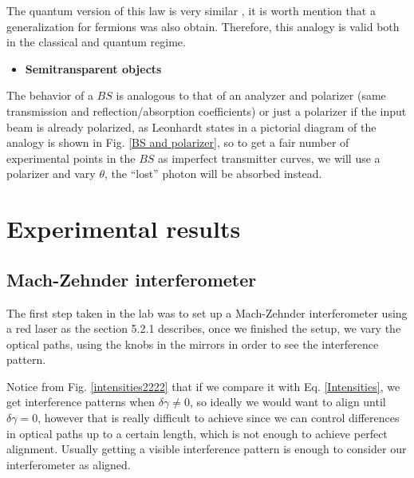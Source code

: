 \documentclass[12pt]{book}
\begin{document}
The quantum version of this law is very similar \cite{malus}, it is worth mention that a generalization for fermions was also obtain. Therefore, this analogy is valid both in the classical and quantum regime.
 \begin{itemize}
\item {\large \textbf{Semitransparent objects}}
\end{itemize}

The behavior of a $BS$ is analogous to that of an analyzer and polarizer (same transmission and reflection/absorption coefficients) or just a polarizer if the input beam is already polarized, as Leonhardt states in \cite{nosirve} a pictorial diagram of the analogy is shown in Fig. \ref{BS and polarizer}, so to get a fair number of experimental points in the $BS$ as imperfect transmitter curves, we will use a polarizer and vary $\theta$, the ``lost'' photon will be absorbed instead. 








  
 \pagebreak
 

\chapter{Experimental results}

\section{Mach-Zehnder interferometer}

The first step taken in the lab was to set up a Mach-Zehnder interferometer using a red laser as the section 5.2.1 describes, once we finished the setup, we vary the optical paths, using the knobs in the mirrors in order to see the interference pattern.

Notice from Fig. \ref{intensities2222} that if we compare it with Eq. \ref{Intensities}, we get interference patterns when $\delta \gamma \neq 0$, so ideally we would want to align until $\delta \gamma=0$, however that is really difficult to achieve since we can control differences in optical paths up to a certain length, which is not enough to achieve perfect alignment. Usually getting a visible interference pattern is enough to consider our interferometer as aligned. 
\end{document}
